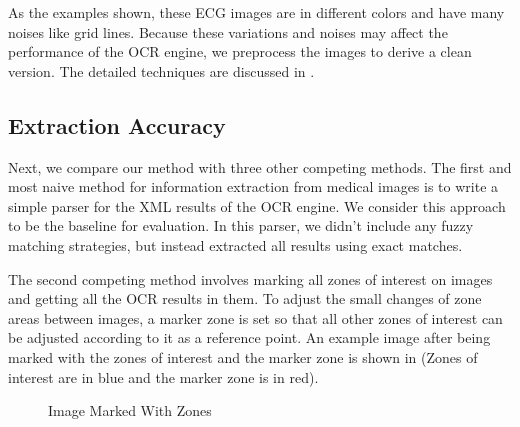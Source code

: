 As the examples shown, these ECG images are in different colors 
and have many noises like grid lines. 
Because these variations and noises
may affect the performance of the OCR engine, 
we preprocess the images to derive a clean version. 
The detailed techniques are discussed in . 


\subsection{Extraction Accuracy}
Next, we compare our method with three other competing methods.
The first and most naive method for information extraction from medical images 
is to write a simple parser for the XML results of the OCR engine. 
We consider this approach to be the baseline for 
evaluation. In this parser, we didn't include any fuzzy matching 
strategies, but instead extracted all results using exact matches. 

The second competing method involves marking all zones of interest on images and 
getting all the OCR results in them. To adjust the small changes of 
zone areas between images, a marker zone is set so that 
all other zones of interest can be adjusted according to it as
a reference point. 
An example image after being marked with the zones of interest 
and the marker zone is shown in  (Zones of interest 
are in blue and the marker zone is in red).

\begin{figure}[ht]
\centering
{}
\caption{Image Marked With Zones}
\label{fig:zOCR}
\end{figure}


